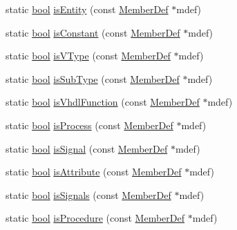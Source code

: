 \begin{DoxyCompactItemize}
\item 
static \hyperlink{qglobal_8h_a1062901a7428fdd9c7f180f5e01ea056}{bool} \hyperlink{class_vhdl_doc_gen_a65218023c4970a90f3bce70938a99781}{is\+Entity} (const \hyperlink{class_member_def}{Member\+Def} $\ast$mdef)
\item 
static \hyperlink{qglobal_8h_a1062901a7428fdd9c7f180f5e01ea056}{bool} \hyperlink{class_vhdl_doc_gen_a2c3cdcd27394531385ccd8c56257edc1}{is\+Constant} (const \hyperlink{class_member_def}{Member\+Def} $\ast$mdef)
\item 
static \hyperlink{qglobal_8h_a1062901a7428fdd9c7f180f5e01ea056}{bool} \hyperlink{class_vhdl_doc_gen_a8ab98ceef0a36aea7a15c548ec9aa455}{is\+V\+Type} (const \hyperlink{class_member_def}{Member\+Def} $\ast$mdef)
\item 
static \hyperlink{qglobal_8h_a1062901a7428fdd9c7f180f5e01ea056}{bool} \hyperlink{class_vhdl_doc_gen_ab57f7d02afdd7034f78894b20e6ff4aa}{is\+Sub\+Type} (const \hyperlink{class_member_def}{Member\+Def} $\ast$mdef)
\item 
static \hyperlink{qglobal_8h_a1062901a7428fdd9c7f180f5e01ea056}{bool} \hyperlink{class_vhdl_doc_gen_a8808d28bf43d889892a8b6bad0793d7d}{is\+Vhdl\+Function} (const \hyperlink{class_member_def}{Member\+Def} $\ast$mdef)
\item 
static \hyperlink{qglobal_8h_a1062901a7428fdd9c7f180f5e01ea056}{bool} \hyperlink{class_vhdl_doc_gen_a212ea7da7de8f22c3ca1dd14a38a67ef}{is\+Process} (const \hyperlink{class_member_def}{Member\+Def} $\ast$mdef)
\item 
static \hyperlink{qglobal_8h_a1062901a7428fdd9c7f180f5e01ea056}{bool} \hyperlink{class_vhdl_doc_gen_a07199651d2f493ee3afe42975df77efb}{is\+Signal} (const \hyperlink{class_member_def}{Member\+Def} $\ast$mdef)
\item 
static \hyperlink{qglobal_8h_a1062901a7428fdd9c7f180f5e01ea056}{bool} \hyperlink{class_vhdl_doc_gen_a2dc9e668acc7c79f211709e2a0eeccad}{is\+Attribute} (const \hyperlink{class_member_def}{Member\+Def} $\ast$mdef)
\item 
static \hyperlink{qglobal_8h_a1062901a7428fdd9c7f180f5e01ea056}{bool} \hyperlink{class_vhdl_doc_gen_a7fb01b11d2a225ee8d8c43a56862be8b}{is\+Signals} (const \hyperlink{class_member_def}{Member\+Def} $\ast$mdef)
\item 
static \hyperlink{qglobal_8h_a1062901a7428fdd9c7f180f5e01ea056}{bool} \hyperlink{class_vhdl_doc_gen_aed906dd71cdcb8aca1bc6e3f9fba9732}{is\+Procedure} (const \hyperlink{class_member_def}{Member\+Def} $\ast$mdef)
\item 

\end{DoxyCompactItemize}
